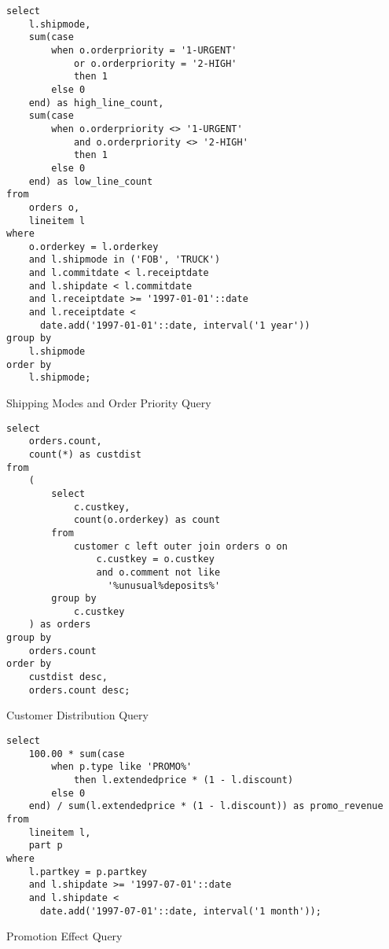 \begin{listing}[!ht]
\begin{verbatim}
select
    l.shipmode,
    sum(case
        when o.orderpriority = '1-URGENT'
            or o.orderpriority = '2-HIGH'
            then 1
        else 0
    end) as high_line_count,
    sum(case
        when o.orderpriority <> '1-URGENT'
            and o.orderpriority <> '2-HIGH'
            then 1
        else 0
    end) as low_line_count
from
    orders o,
    lineitem l
where
    o.orderkey = l.orderkey
    and l.shipmode in ('FOB', 'TRUCK')
    and l.commitdate < l.receiptdate
    and l.shipdate < l.commitdate
    and l.receiptdate >= '1997-01-01'::date
    and l.receiptdate <
      date.add('1997-01-01'::date, interval('1 year'))
group by
    l.shipmode
order by
    l.shipmode;
\end{verbatim}
\caption{Shipping Modes and Order Priority Query}
\end{listing}

\begin{listing}[!ht]
\begin{verbatim}
select
    orders.count,
    count(*) as custdist
from
    (
        select
            c.custkey,
            count(o.orderkey) as count
        from
            customer c left outer join orders o on
                c.custkey = o.custkey
                and o.comment not like
                  '%unusual%deposits%'
        group by
            c.custkey
    ) as orders
group by
    orders.count
order by
    custdist desc,
    orders.count desc;
\end{verbatim}
\caption{Customer Distribution Query}
\end{listing}

\begin{listing}[!ht]
\begin{verbatim}
select
    100.00 * sum(case
        when p.type like 'PROMO%'
            then l.extendedprice * (1 - l.discount)
        else 0
    end) / sum(l.extendedprice * (1 - l.discount)) as promo_revenue
from
    lineitem l,
    part p
where
    l.partkey = p.partkey
    and l.shipdate >= '1997-07-01'::date
    and l.shipdate <
      date.add('1997-07-01'::date, interval('1 month'));
\end{verbatim}
\caption{Promotion Effect Query}
\end{listing}

\setcounter{listing}{15}

